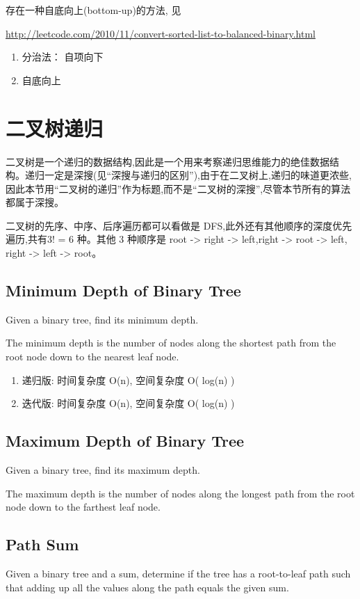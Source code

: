 \documentclass[12pt]{book}
\begin{document}
存在一种自底向上(bottom-up)的方法, 见 

\url{http://leetcode.com/2010/11/convert-sorted-list-to-balanced-binary.html}
\begin{enumerate}
\item 分治法： 自项向下
\label{sec-4-4-3-1}
\item 自底向上
\label{sec-4-4-3-2}
\end{enumerate}
\section{二叉树递归}
\label{sec-4-5}
二叉树是一个递归的数据结构,因此是一个用来考察递归思维能力的绝佳数据结构。递归一定是深搜(见“深搜与递归的区别”),由于在二叉树上,递归的味道更浓些,因此本节用“二叉树的递归”作为标题,而不是“二叉树的深搜”,尽管本节所有的算法都属于深搜。

二叉树的先序、中序、后序遍历都可以看做是 DFS,此外还有其他顺序的深度优先遍历,共有3! = 6 种。其他 3 种顺序是 root -> right -> left,right -> root -> left, right -> left -> root。
\subsection{Minimum Depth of Binary Tree}
\label{sec-4-5-1}
Given a binary tree, find its minimum depth.

The minimum depth is the number of nodes along the shortest path from the root node down to the nearest leaf node.
\begin{enumerate}
\item 递归版: 时间复杂度 O(n), 空间复杂度 O( log(n) )
\label{sec-4-5-1-1}
\item 迭代版: 时间复杂度 O(n), 空间复杂度 O( log(n) )
\label{sec-4-5-1-2}
\end{enumerate}

\subsection{Maximum Depth of Binary Tree}
\label{sec-4-5-2}
Given a binary tree, find its maximum depth.

The maximum depth is the number of nodes along the longest path from the root node down to the farthest leaf node.

\subsection{Path Sum}
\label{sec-4-5-3}
Given a binary tree and a sum, determine if the tree has a root-to-leaf path such that adding up all the values along the path equals the given sum.
\end{document}
